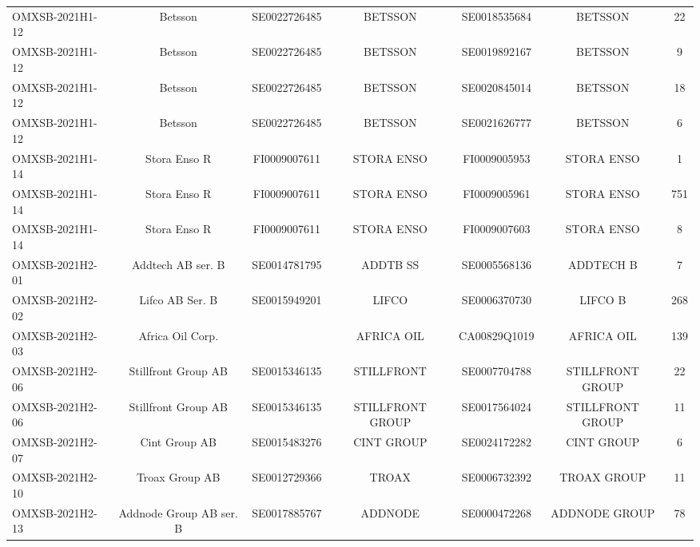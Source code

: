 \begin{threeparttable}
\begin{tabular}{@{}lcccccc}
\addlinespace[0.25ex]
OMXSB-2021H1-12 & Betsson & SE0022726485 & BETSSON & SE0018535684 & BETSSON & 22 \\
\addlinespace[0.25ex]
\addlinespace[0.25ex]
OMXSB-2021H1-12 & Betsson & SE0022726485 & BETSSON & SE0019892167 & BETSSON & 9 \\
\addlinespace[0.25ex]
\addlinespace[0.25ex]
OMXSB-2021H1-12 & Betsson & SE0022726485 & BETSSON & SE0020845014 & BETSSON & 18 \\
\addlinespace[0.25ex]
\addlinespace[0.25ex]
OMXSB-2021H1-12 & Betsson & SE0022726485 & BETSSON & SE0021626777 & BETSSON & 6 \\
\addlinespace[0.25ex]
\addlinespace[0.25ex]
OMXSB-2021H1-14 & Stora Enso R & FI0009007611 & STORA ENSO & FI0009005953 & STORA ENSO & 1 \\
\addlinespace[0.25ex]
\addlinespace[0.25ex]
OMXSB-2021H1-14 & Stora Enso R & FI0009007611 & STORA ENSO & FI0009005961 & STORA ENSO & 751 \\
\addlinespace[0.25ex]
\addlinespace[0.25ex]
OMXSB-2021H1-14 & Stora Enso R & FI0009007611 & STORA ENSO & FI0009007603 & STORA ENSO & 8 \\
\addlinespace[0.25ex]
\addlinespace[0.25ex]
OMXSB-2021H2-01 & Addtech AB ser. B & SE0014781795 & ADDTB SS & SE0005568136 & ADDTECH B & 7 \\
\addlinespace[0.25ex]
\addlinespace[0.25ex]
OMXSB-2021H2-02 & Lifco AB Ser. B & SE0015949201 & LIFCO & SE0006370730 & LIFCO B & 268 \\
\addlinespace[0.25ex]
\addlinespace[0.25ex]
OMXSB-2021H2-03 & Africa Oil Corp. &  & AFRICA OIL & CA00829Q1019 & AFRICA OIL & 139 \\
\addlinespace[0.25ex]
\addlinespace[0.25ex]
OMXSB-2021H2-06 & Stillfront Group AB & SE0015346135 & STILLFRONT & SE0007704788 & STILLFRONT GROUP & 22 \\
\addlinespace[0.25ex]
\addlinespace[0.25ex]
OMXSB-2021H2-06 & Stillfront Group AB & SE0015346135 & STILLFRONT GROUP & SE0017564024 & STILLFRONT GROUP & 11 \\
\addlinespace[0.25ex]
\addlinespace[0.25ex]
OMXSB-2021H2-07 & Cint Group AB & SE0015483276 & CINT GROUP & SE0024172282 & CINT GROUP & 6 \\
\addlinespace[0.25ex]
\addlinespace[0.25ex]
OMXSB-2021H2-10 & Troax Group AB & SE0012729366 & TROAX & SE0006732392 & TROAX GROUP & 11 \\
\addlinespace[0.25ex]
\addlinespace[0.25ex]
OMXSB-2021H2-13 & Addnode Group AB ser. B & SE0017885767 & ADDNODE & SE0000472268 & ADDNODE GROUP & 78 \\

\end{tabular}
\end{threeparttable}
